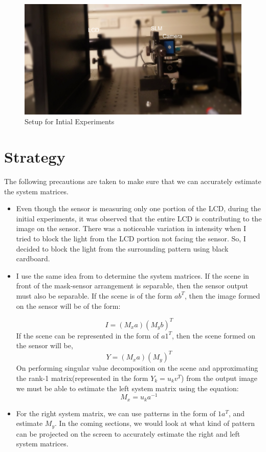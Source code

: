 \begin{figure}[h]
\centering
\includegraphics[width = 0.75\linewidth]{pics/experiment_lcd}
\caption{Setup for Intial Experiments}
\label{fig:experiment_lcd}
\end{figure}

\section{Strategy}
The following precautions are taken to make sure that we can accurately estimate the system matrices.
\begin{itemize}
\item Even though the sensor is measuring only one portion of the LCD, during the initial experiments, it was observed that the entire LCD is contributing to the image on the sensor. There was a noticeable variation in intensity when I tried to block the light from the LCD portion not facing the sensor. So, I decided to block the light from the surrounding pattern using black cardboard.
\item I use the same idea from \cite{Flatcam} to determine the system matrices. If the scene in front of the mask-sensor arrangement is separable, then the sensor output must also be separable. If the scene is of the form $ab^T$, then the image formed on the sensor will be of the form:

\begin{equation}
I = (M_xa)(M_yb)^T
\end{equation}
If the scene can be represented in the form of $a1^T$, then the scene formed on the sensor will be,
\begin{equation}
Y = (M_xa)(M_y)^T
\label{eq:separ_eq}
\end{equation}
On performing singular value decomposition on the scene and approximating the rank-1 matrix(represented in the form $Y_k = u_k v^T$) from the output image we must be able to estimate the left system matrix using the equation:
\begin{equation}
M_x = u_ka^{-1}
\end{equation}
\item For the right system matrix, we can use patterns in the form of $1a^T$, and estimate $M_y$. In the coming sections, we would look at what kind of pattern can be projected on the screen to accurately estimate the right and left system matrices. 
\end{itemize}

